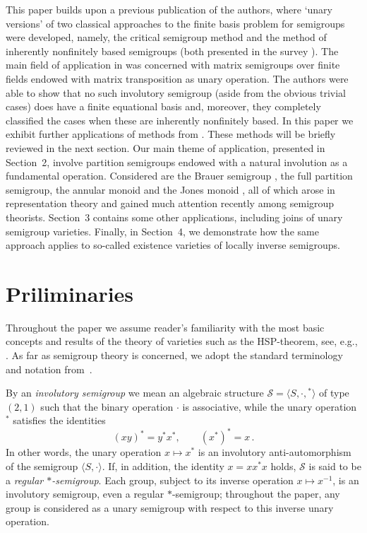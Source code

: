 \documentclass[preprint,1p,times]{elsarticle}
\numberwithin{equation}{section}
\theoremstyle{remark}
\begin{document}
This paper builds upon a previous publication \cite{adv} of the authors, where `unary versions' of two classical
approaches to the finite basis problem for semigroups were developed, namely, the critical semigroup method and the
method of inherently nonfinitely based semigroups (both presented in the survey \cite{volkovjaponicae}). The main field
of application in \cite{adv} was concerned with matrix semigroups over finite fields endowed with matrix transposition
as unary operation. The authors were able to show that no such involutory semigroup (aside from the obvious trivial
cases) does have a finite equational basis and, moreover, they completely classified the cases when these are
inherently nonfinitely based. In this paper we exhibit further applications of methods from \cite{adv}. These methods
will be briefly reviewed in the next section. Our main theme of application, presented in Section~2, involve partition
semigroups endowed with a natural involution as a fundamental operation. Considered are the Brauer semigroup
\cite{brauer}, the full partition semigroup, the annular monoid and the Jones monoid \cite{jones}, all of which arose
in representation theory and gained much attention recently among semigroup theorists. Section~3 contains some other
applications, including joins of unary semigroup varieties. Finally, in Section~4, we demonstrate how the same approach
applies to so-called existence varieties of locally inverse semigroups.

\section{Priliminaries}

Throughout the paper we assume reader's familiarity with the most basic concepts and results of the theory of varieties
such as the HSP-theorem, see, e.g., \cite[Chapter~II]{BuSa81}. As far as semi\-group theory is concerned, we adopt the
standard terminology and notation from~\cite{CP}.

By an \emph{involutory semigroup} we mean an algebraic structure $\mathcal{S}=\langle S,\cdot,{}^*\rangle$ of type
$(2,1)$ such that the binary operation $\cdot$ is associative, while the unary operation ${}^*$ satisfies the
identities
$$
(xy)^* = y^*x^*,\qquad (x^*)^*= x\,.
$$
In other words, the unary operation $x\mapsto x^*$ is an involutory anti-automorphism of the semigroup $\langle
S,\cdot\rangle$. If, in addition, the identity $x=xx^*x$ holds, $\mathcal{S}$ is said to be a \emph{regular
$*$-semigroup}. Each group, subject to its inverse operation $x\mapsto x^{-1}$, is an involutory semigroup, even a
regular $*$-semigroup; throughout the paper, any group is considered as a unary semigroup with respect to this inverse
unary operation.
\end{document}
